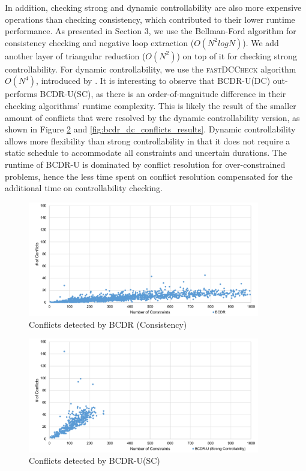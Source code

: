 \documentclass[jair,twoside,11pt,theapa]{article}
\begin{document}
In addition, checking strong and dynamic controllability are also more expensive
operations than checking consistency, which contributed to their lower runtime
performance. As presented in Section 3, we use the Bellman-Ford algorithm for
consistency checking and negative loop extraction ($O(N^2logN)$). We add another
layer of triangular reduction ($O(N^2)$) on top of it for checking strong
controllability. For dynamic controllability, we use the \textsc{fastDCCheck}
algorithm $O(N^4)$, introduced by . It is interesting to observe
that BCDR-U(DC) out-performs BCDR-U(SC), as there is an order-of-magnitude difference in their checking
algorithms' runtime complexity. This is likely the result of the smaller amount
of conflicts that were resolved by the dynamic controllability version, as shown
in Figure \ref{fig:bcdr_sc_conflicts_results} and
\ref{fig:bcdr_dc_conflicts_results}. Dynamic controllability allows more
flexibility than strong controllability in that it does not require a static
schedule to accommodate all constraints and uncertain durations. The runtime of
BCDR-U is dominated by conflict resolution for over-constrained problems, hence
the less time spent on conflict resolution compensated for the additional time
on controllability checking.


\begin{figure}[!ht]
	\centering
	\includegraphics[width=0.9\textwidth]{figures/results/bcdr_c_conflicts.pdf}
	\caption{Conflicts detected by BCDR (Consistency)}
	\label{fig:bcdr_conflicts_results}
\end{figure}

\begin{figure}[!ht]
	\centering
	\includegraphics[width=0.9\textwidth]{figures/results/bcdr_sc_conflicts.pdf}
	\caption{Conflicts detected by BCDR-U(SC)}
	\label{fig:bcdr_sc_conflicts_results}
\end{figure}
\end{document}
